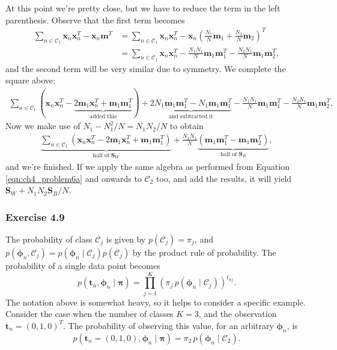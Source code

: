 \documentclass[12pt, a4paper]{article}
\newcommand{\vect}[1]{\bm{#1}}
\begin{document}
At this point we're pretty close, but we have to reduce the term in the left parenthesis.
Observe that the first term becomes
\begin{align}
	\nonumber \sum_{n \in \mathcal{C}_1} \vect{x}_n \vect{x}_n^T - \vect{x}_n \vect{m}^T  &= 
	\sum_{n \in \mathcal{C}_1} \vect{x}_n \vect{x}_n^T - \vect{x}_n \left( \frac{N_1}{N} \vect{m}_1 + \frac{N_2}{N} \vect{m}_2 \right)^T \\
	\label{eqn:ch4_problem6a}
	&= 
	\sum_{n \in \mathcal{C}_1} \vect{x}_n \vect{x}_n^T - 
	 \frac{N_1 N_1}{N} \vect{m}_1 \vect{m}_1^T - \frac{N_2 N_1}{N} \vect{m}_1 \vect{m}_2^T,
\end{align}
and the second term will be very similar due to symmetry.
We complete the square above:
\begin{align*}
	\sum_{n \in \mathcal{C}_1} 
	\left( \vect{x}_n \vect{x}_n^T 
	-
	\underbrace{2 \vect{m}_1 \vect{x}_n^T 
		+ \vect{m}_1 \vect{m}_1^T}_{\text{added this}} \right)
	+
	\underbrace{2 N_1 \vect{m}_1 \vect{m}_1^T
		-
		N_1 \vect{m}_1 \vect{m}_1^T}_{\text{and subtracted it}}
	-
	\frac{N_1 N_1}{N} \vect{m}_1 \vect{m}_1^T
	 - \frac{N_2 N_1}{N} \vect{m}_1 \vect{m}_2^T ,
\end{align*}
Now we make use of $N_1 - N_1^2 /N = N_1 N_2 /N$ to obtain
\begin{align*}
\underbrace{\sum_{n \in \mathcal{C}_1} 
	\left( \vect{x}_n \vect{x}_n^T -2 \vect{m}_1 \vect{x}_n^T + \vect{m}_1 \vect{m}_1^T \right)}_{\text{half of } \vect{S}_W}
+
\frac{N_2 N_1}{N}
\underbrace{\left( \vect{m}_1 \vect{m}_1^T
	- \vect{m}_1 \vect{m}_2^T \right)}_{\text{half of } \vect{S}_B},
\end{align*}
and we're finished. 
If we apply the same algebra as performed from Equation \eqref{eqn:ch4_problem6a} and onwards to $\mathcal{C}_2$ too, and add the results, it will yield $\vect{S}_W + N_1 N_2 \vect{S}_B / N$.



\subsubsection*{Exercise 4.9}
The probability of class $\mathcal{C}_j$ is given by $p(\mathcal{C}_j) = \pi_j$, and $p(\vect{\phi}_n, \mathcal{C}_j) = p(\vect{\phi}_n \mid  \mathcal{C}_j) p( \mathcal{C}_j)$ by the product rule of probability.
The probability of a single data point becomes
\begin{equation*}
	p(\vect{t}_n, \vect{\phi}_n \mid \vect{\pi}) = 
	\prod_{j = 1}^{K} \left( \pi_j \, p(\vect{\phi}_n \mid  \mathcal{C}_j)  \right)^{t_{nj}}.
\end{equation*}
The notation above is somewhat heavy, so it helps to consider a specific example.
Consider the case when the number of classes $K = 3$, and the observation $\vect{t}_n = (0, 1, 0)^T$. 
The probability of observing this value, for an arbitrary $\vect{\phi}_n$,  is
\begin{equation*}
p(\vect{t}_n = (0, 1, 0), \vect{\phi}_n \mid \vect{\pi}) =  \pi_2 \, p(\vect{\phi}_n \mid  \mathcal{C}_2).
\end{equation*}
\end{document}
